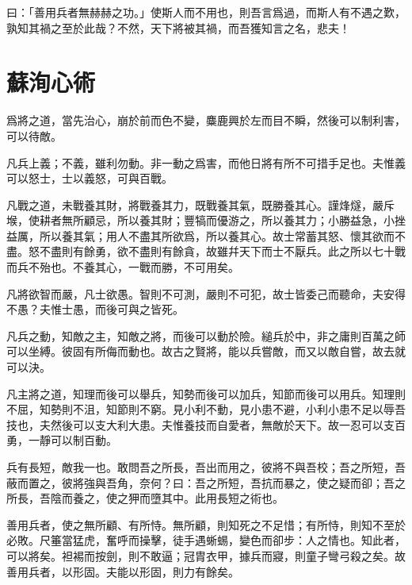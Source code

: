 曰：「善用兵者無赫赫之功。」使斯人而不用也，則吾言爲過，而斯人有不遇之歎，孰知其禍之至於此哉？不然，天下將被其禍，而吾獲知言之名，悲夫！

\section[心術\quad{\small 蘇洵}]{{\normalsize 蘇洵}\quad 心術}
爲將之道，當先治心，崩於前而色不變，麋鹿興於左而目不瞬，然後可以制利害，可以待敵。

凡兵上義；不義，雖利勿動。非一動之爲害，而他日將有所不可措手足也。夫惟義可以怒士，士以義怒，可與百戰。

凡戰之道，未戰養其財，將戰養其力，既戰養其氣，既勝養其心。謹烽燧，嚴斥堠，使耕者無所顧忌，所以養其財；豐犒而優游之，所以養其力；小勝益急，小挫益厲，所以養其氣；用人不盡其所欲爲，所以養其心。故士常蓄其怒、懷其欲而不盡。怒不盡則有餘勇，欲不盡則有餘貪，故雖幷天下而士不厭兵。此之所以七十戰而兵不殆也。不養其心，一戰而勝，不可用矣。

凡將欲智而嚴，凡士欲愚。智則不可測，嚴則不可犯，故士皆委己而聽命，夫安得不愚？夫惟士愚，而後可與之皆死。

凡兵之動，知敵之主，知敵之將，而後可以動於險。縋兵於中，非之庸則百萬之師可以坐縛。彼固有所侮而動也。故古之賢將，能以兵嘗敵，而又以敵自嘗，故去就可以決。

凡主將之道，知理而後可以舉兵，知勢而後可以加兵，知節而後可以用兵。知理則不屈，知勢則不沮，知節則不窮。見小利不動，見小患不避，小利小患不足以辱吾技也，夫然後可以支大利大患。夫惟養技而自愛者，無敵於天下。故一忍可以支百勇，一靜可以制百動。

兵有長短，敵我一也。敢問吾之所長，吾出而用之，彼將不與吾校；吾之所短，吾蔽而置之，彼將強與吾角，奈何？曰：吾之所短，吾抗而暴之，使之疑而卻；吾之所長，吾陰而養之，使之狎而墮其中。此用長短之術也。

善用兵者，使之無所顧、有所恃。無所顧，則知死之不足惜；有所恃，則知不至於必敗。尺箠當猛虎，奮呼而操擊，徒手遇蜥蜴，變色而卻步：人之情也。知此者，可以將矣。袒裼而按劍，則不敢逼；冠胄衣甲，據兵而寢，則童子彎弓殺之矣。故善用兵者，以形固。夫能以形固，則力有餘矣。

